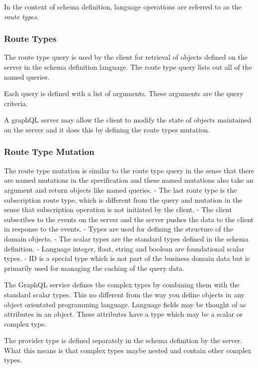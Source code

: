 In the context of schema definition, language operations are referred to as the \textit{route types}.

\subsubsection{Route Types}
The route type query is used by the client for retrieval of objects defined on the server in the schema definition language.
The route type query lists out all of the named queries.

Each query is defined with a list of arguments.
These arguments are the query criteria.

A graphQL server may allow the client to modify the state of objects maintained on the server and it does this by defining the route types mutation.

\subsubsection{Route Type Mutation}
The route type mutation is similar to the route type query in the sense that there are named mutations in the specification and these named mutations also take an argument and return objects like named queries.
- The last route type is the subscription route type, which is different from the query and mutation in the sense that subscription operation is not initiated by the client.
- The client subscribes to the events on the server and the server pushes the data to the client in response to the events.
- Types are used for defining the structure of the domain objects.
- The scalar types are the standard types defined in the schema definition.
- Language integer, float, string and boolean are foundational scalar types.
- ID is a special type which is not part of the business domain data but is primarily used for managing the caching of the query data.

The GraphQL service defines the complex types by combining them with the standard scalar types.
This no different from the way you define objects in any object orientated programming language.
Language fields may be thought of as attributes in an object.
These attributes have a type which may be a scalar or complex type.


The provider type is defined separately in the schema definition by the server.
What this means is that complex types maybe nested and contain other complex types.

